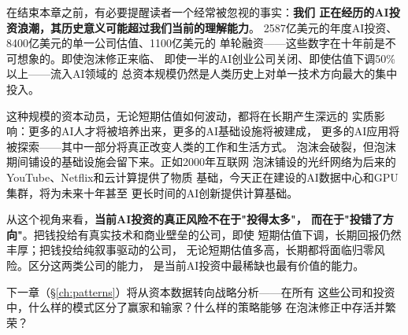 在结束本章之前，有必要提醒读者一个经常被忽视的事实：\textbf{我们
正在经历的AI投资浪潮，其历史意义可能超过我们当前的理解能力}。
2587亿美元的年度AI投资、8400亿美元的单一公司估值、1100亿美元的
单轮融资——这些数字在十年前是不可想象的。即使泡沫修正来临、
即使一半的AI创业公司关闭、即使估值下调50\%以上——流入AI领域的
总资本规模仍然是人类历史上对单一技术方向最大的集中投入。

这种规模的资本动员，无论短期估值如何波动，都将在长期产生深远的
实质影响：更多的AI人才将被培养出来，更多的AI基础设施将被建成，
更多的AI应用将被探索——其中一部分将真正改变人类的工作和生活方式。
泡沫会破裂，但泡沫期间铺设的基础设施会留下来。正如2000年互联网
泡沫铺设的光纤网络为后来的YouTube、Netflix和云计算提供了物质
基础，今天正在建设的AI数据中心和GPU集群，将为未来十年甚至
更长时间的AI创新提供计算基础。

从这个视角来看，\textbf{当前AI投资的真正风险不在于"投得太多"，
而在于"投错了方向"}。把钱投给有真实技术和商业壁垒的公司，即使
短期估值下调，长期回报仍然丰厚；把钱投给纯叙事驱动的公司，
无论短期估值多高，长期都将面临归零风险。区分这两类公司的能力，
是当前AI投资中最稀缺也最有价值的能力。

下一章（\S\ref{ch:patterns}）将从资本数据转向战略分析——在所有
这些公司和投资中，什么样的模式区分了赢家和输家？什么样的策略能够
在泡沫修正中存活并繁荣？
